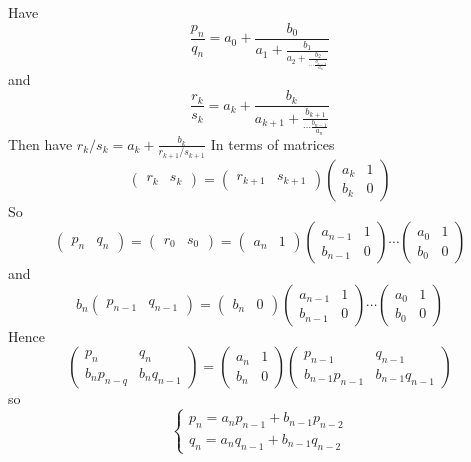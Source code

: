 \documentclass{article}
\theoremstyle{definition}
\theoremstyle{remark}
\theoremstyle{plain}
\begin{document}
Have \[\frac{p_n}{q_n}=a_0+\frac{b_0}{a_1+\frac{b_1}{a_2+\frac{b_2}{\cdots\frac{b_{n-1}}{a_n}}}}\]
and \[\frac{r_k}{s_k}=a_k+\frac{b_k}{a_{k+1}+\frac{b_{k+1}}{\cdots\frac{b_{n-1}}{a_n}}}\]
Then have $r_k/s_k=a_k+\frac{b_k}{r_{k+1}/s_{k+1}}$
In terms of matrices
\[\begin{pmatrix}
    r_k & s_k
\end{pmatrix}=\begin{pmatrix}
    r_{k+1}&s_{k+1}
\end{pmatrix}\begin{pmatrix}
    a_k&1\\ b_k&0
\end{pmatrix}\]
So
\[\begin{pmatrix}
    p_n&q_n
\end{pmatrix}=\begin{pmatrix}
    r_0&s_0
\end{pmatrix}=\begin{pmatrix}
    a_n&1
\end{pmatrix}\begin{pmatrix}
    a_{n-1}&1\\ b_{n-1}&0
\end{pmatrix}\cdots\begin{pmatrix}
    a_0&1\\b_0&0
\end{pmatrix}\]
and
\[b_n\begin{pmatrix}
    p_{n-1}&q_{n-1}
\end{pmatrix}=\begin{pmatrix}
    b_n&0
\end{pmatrix}\begin{pmatrix}
    a_{n-1}&1\\b_{n-1}&0
\end{pmatrix}\cdots\begin{pmatrix}
    a_0&1\\b_0&0
\end{pmatrix}\]
Hence
\[\begin{pmatrix}
    p_n&q_n\\b_np_{n-q}&b_nq_{n-1}
\end{pmatrix}=\begin{pmatrix}
    a_n&1\\b_n&0
\end{pmatrix}\begin{pmatrix}
    p_{n-1}&q_{n-1}\\b_{n-1}p_{n-1}&b_{n-1}q_{n-1}
\end{pmatrix}\]
so \[\begin{cases}
    p_n=a_np_{n-1}+b_{n-1}p_{n-2}\\
    q_n=a_nq_{n-1}+b_{n-1}q_{n-2}
\end{cases}\tag{$\dagger$}\]
\end{document}

